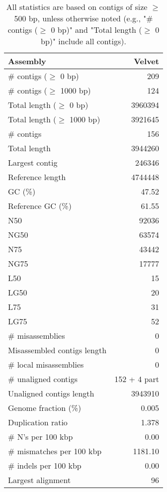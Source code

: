 \documentclass[12pt,a4paper]{article}
\begin{document}
\begin{table}[ht]
\begin{center}
\caption{All statistics are based on contigs of size $\geq$ 500 bp, unless otherwise noted (e.g., "\# contigs ($\geq$ 0 bp)" and "Total length ($\geq$ 0 bp)" include all contigs).}
\begin{tabular}{|l*{1}{|r}|}
\hline
Assembly & Velvet \\ \hline
\# contigs ($\geq$ 0 bp) & 209 \\ \hline
\# contigs ($\geq$ 1000 bp) & 124 \\ \hline
Total length ($\geq$ 0 bp) & 3960394 \\ \hline
Total length ($\geq$ 1000 bp) & 3921645 \\ \hline
\# contigs & 156 \\ \hline
Total length & 3944260 \\ \hline
Largest contig & 246346 \\ \hline
Reference length & 4744448 \\ \hline
GC (\%) & 47.52 \\ \hline
Reference GC (\%) & 61.55 \\ \hline
N50 & 92036 \\ \hline
NG50 & 63574 \\ \hline
N75 & 43442 \\ \hline
NG75 & 17777 \\ \hline
L50 & 15 \\ \hline
LG50 & 20 \\ \hline
L75 & 31 \\ \hline
LG75 & 52 \\ \hline
\# misassemblies & 0 \\ \hline
Misassembled contigs length & 0 \\ \hline
\# local misassemblies & 0 \\ \hline
\# unaligned contigs & 152 + 4 part \\ \hline
Unaligned contigs length & 3943910 \\ \hline
Genome fraction (\%) & 0.005 \\ \hline
Duplication ratio & 1.378 \\ \hline
\# N's per 100 kbp & 0.00 \\ \hline
\# mismatches per 100 kbp & 1181.10 \\ \hline
\# indels per 100 kbp & 0.00 \\ \hline
Largest alignment & 96 \\ \hline
\end{tabular}
\end{center}
\end{table}
\end{document}
